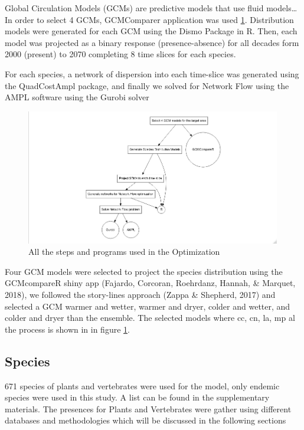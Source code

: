 \documentclass[]{article}
\begin{document}
Global Circulation Models (GCMs) are predictive models that use fluid models\ldots{} In order to select 4 GCMs, GCMComparer application was used \ref{fig:Diagrama}. Distribution models were generated for each GCM using the Dismo Package in R. Then, each model was projected as a binary response (presence-absence) for all decades form 2000 (present) to 2070 completing 8 time slices for each species.

For each species, a network of dispersion into each time-slice was generated using the QuadCostAmpl package, and finally we solved for Network Flow using the AMPL software using the Gurobi solver

\begin{figure}
\includegraphics[width=4.39in]{Diag1} \caption{All the steps and programs used in the Optimization}\label{fig:Diagrama}
\end{figure}

Four GCM models were selected to project the species distribution using the GCMcompareR shiny app (Fajardo, Corcoran, Roehrdanz, Hannah, \& Marquet, 2018), we followed the story-lines approach (Zappa \& Shepherd, 2017) and selected a GCM warmer and wetter, warmer and dryer, colder and wetter, and colder and dryer than the ensemble. The selected models where cc, cn, la, mp al the process is shown in in figure \ref{fig:Diagrama}.

\hypertarget{species}{%
\subsection{Species}\label{species}}

671 species of plants and vertebrates were used for the model, only endemic species were used in this study. A list can be found in the supplementary materials. The presences for Plants and Vertebrates were gather using different databases and methodologies which will be discussed in the following sections
\end{document}
